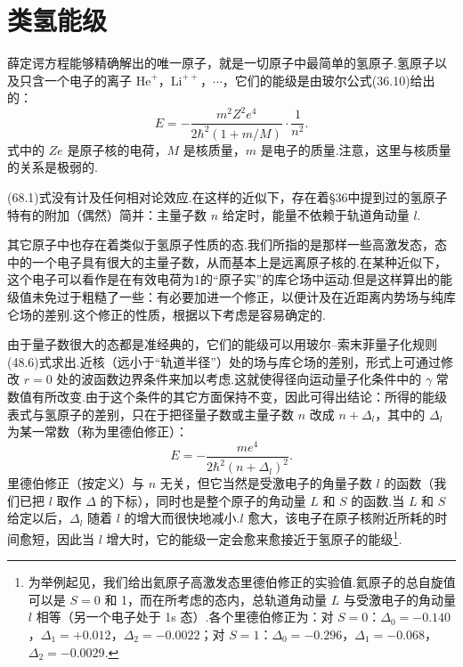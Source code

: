 \section{类氢能级}

薛定谔方程能够精确解出的唯一原子，就是一切原子中最简单的氢原子.氢原子以及只含一个电子的离子 $\mathrm{He}^{+}$，$\mathrm{Li}^{++}$，$\cdots$，它们的能级是由玻尔公式(36.10)给出的：
\begin{equation}
  E=-\frac{m^{2}Z^{2}e^{4}}{2\hbar^{2}(1+m/M)}\cdot\frac{1}{n^{2}}.
\end{equation}
式中的 $Ze$ 是原子核的电荷，$M$ 是核质量，$m$ 是电子的质量.注意，这里与核质量的关系是极弱的.

(68.1)式没有计及任何相对论效应.在这样的近似下，存在着§36中提到过的氢原子特有的附加（偶然）简并：主量子数 $n$ 给定时，能量不依赖于轨道角动量 $l$.

其它原子中也存在着类似于氢原子性质的态.我们所指的是那样一些高激发态，态中的一个电子具有很大的主量子数，从而基本上是远离原子核的.在某种近似下，这个电子可以看作是在有效电荷为1的“原子实”的库仑场中运动.但是这样算出的能级值未免过于粗糙了一些：有必要加进一个修正，以便计及在近距离内势场与纯库仑场的差别.这个修正的性质，根据以下考虑是容易确定的.

由于量子数很大的态都是准经典的，它们的能级可以用玻尔–索末菲量子化规则(48.6)式求出.近核（远小于“轨道半径”）处的场与库仑场的差别，形式上可通过修改 $r=0$ 处的波函数边界条件来加以考虑.这就使得径向运动量子化条件中的 $\gamma$ 常数值有所改变.由于这个条件的其它方面保持不变，因此可得出结论：所得的能级表式与氢原子的差别，只在于把径量子数或主量子数 $n$ 改成 $n+\Delta_l$，其中的 $\Delta_l$ 为某一常数（称为里德伯修正）：
\begin{equation}
  E=-\frac{me^{4}}{2\hbar^{2}\left(n+\Delta_l\right)^{2}}.
\end{equation}
里德伯修正（按定义）与 $n$ 无关，但它当然是受激电子的角量子数 $l$ 的函数（我们已把 $l$ 取作 $\Delta$ 的下标），同时也是整个原子的角动量 $L$ 和 $S$ 的函数.当 $L$ 和 $S$ 给定以后，$\Delta_l$ 随着 $l$ 的增大而很快地减小.$l$ 愈大，该电子在原子核附近所耗的时间愈短，因此当 $l$ 增大时，它的能级一定会愈来愈接近于氢原子的能级\footnote{为举例起见，我们给出氦原子高激发态里德伯修正的实验值.氦原子的总自旋值可以是 $S=0$ 和 1，而在所考虑的态内，总轨道角动量 $L$ 与受激电子的角动量 $l$ 相等（另一个电子处于 1s 态）.各个里德伯修正为：对 $S=0$：$\Delta_0=-0.140$，$\Delta_1=+0.012$，$\Delta_2=-0.0022$；对 $S=1$：$\Delta_0=-0.296$，$\Delta_1=-0.068$，$\Delta_2=-0.0029$.}.

